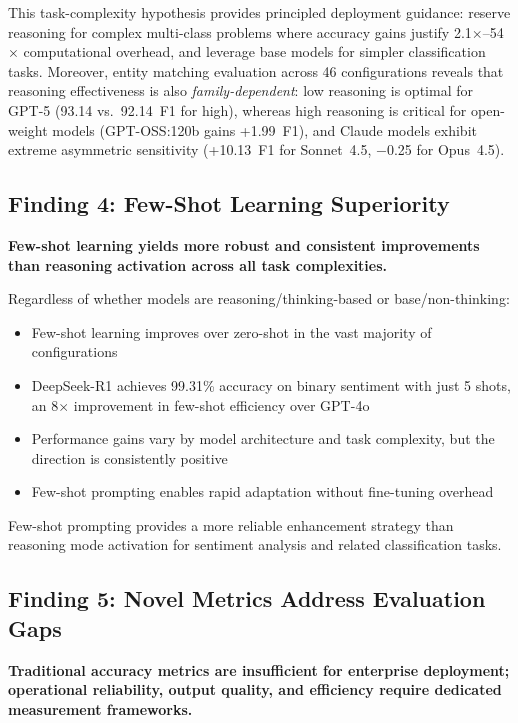 This task-complexity hypothesis provides principled deployment guidance: reserve reasoning for complex multi-class problems where accuracy gains justify 2.1$\times$--54$\times$ computational overhead, and leverage base models for simpler classification tasks.  Moreover, entity matching evaluation across 46 configurations reveals that reasoning effectiveness is also \emph{family-dependent}: low reasoning is optimal for GPT-5 (93.14 vs.\ 92.14~F1 for high), whereas high reasoning is critical for open-weight models (GPT-OSS:120b gains +1.99~F1), and Claude models exhibit extreme asymmetric sensitivity (+10.13~F1 for Sonnet~4.5, $-$0.25 for Opus~4.5).

\subsection{Finding 4: Few-Shot Learning Superiority}

\textbf{Few-shot learning yields more robust and consistent improvements than reasoning activation across all task complexities.}

Regardless of whether models are reasoning/thinking-based or base/non-thinking:
\begin{itemize}[leftmargin=*]
    \item Few-shot learning improves over zero-shot in the vast majority of configurations
    \item DeepSeek-R1 achieves 99.31\% accuracy on binary sentiment with just 5 shots, an 8$\times$ improvement in few-shot efficiency over GPT-4o
    \item Performance gains vary by model architecture and task complexity, but the direction is consistently positive
    \item Few-shot prompting enables rapid adaptation without fine-tuning overhead
\end{itemize}

Few-shot prompting provides a more reliable enhancement strategy than reasoning mode activation for sentiment analysis and related classification tasks.

\subsection{Finding 5: Novel Metrics Address Evaluation Gaps}

\textbf{Traditional accuracy metrics are insufficient for enterprise deployment; operational reliability, output quality, and efficiency require dedicated measurement frameworks.}


